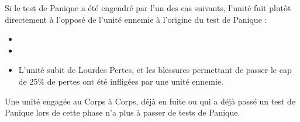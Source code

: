 Si le test de Panique a été engendré par l'un des cas suivants, l'unité fuit plutôt directement à l'opposé de l'unité ennemie à l'origine du test de Panique :
\begin{itemize}[label={-}]
\item {}
\item {}
\item L'unité subit de Lourdes Pertes, et les blessures permettant de passer le cap de 25\% de pertes ont été infligées par une unité ennemie.
\end{itemize}

Une unité engagée au Corps à Corps, déjà en fuite ou qui a déjà passé un test de Panique lors de cette phase n'a plus à passer de tests de Panique.
